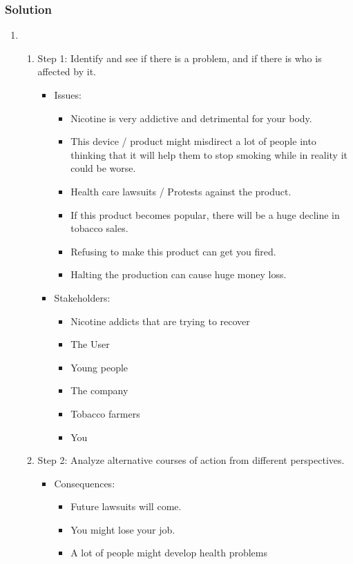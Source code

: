 \documentclass[a4paper, 10pt]{article}
\begin{document}
			\subsubsection{Solution}
				\begin{enumerate}
					\item 
						\begin{enumerate}
							\item Step 1: Identify and see if there is a problem, and if there is who is affected by it. \\
							\begin{itemize}
								\item Issues:
								\begin{itemize}
									\item Nicotine is very addictive and detrimental for your body.
									\item This device / product might misdirect a lot of people into thinking that it will help them to stop smoking while in reality it could be worse.
									\item Health care lawsuits / Protests against the product.
									\item If this product becomes popular, there will be a huge decline in tobacco sales.
									\item Refusing to make this product can get you fired.
									\item Halting the production can cause huge money loss.
								\end{itemize}
							
								\item Stakeholders:
								\begin{itemize}
									\item Nicotine addicts that are trying to recover
									\item The User
									\item Young people
									\item The company
									\item Tobacco farmers
									\item You
								\end{itemize}
							\end{itemize}
						
							\item Step 2: Analyze alternative courses of action from different perspectives.
							\begin{itemize}
								\item Consequences:
								\begin{itemize}
									\item Future lawsuits will come.
									\item You might lose your job.
									\item A lot of people might develop health problems
								\end{itemize}
							

\end{itemize}
\end{enumerate}
\end{enumerate}
\end{document}
